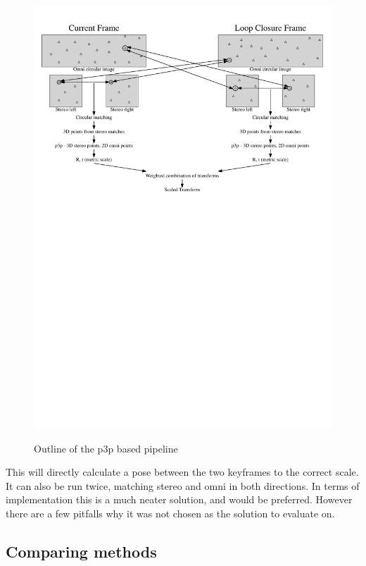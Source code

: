 \begin{figure}[H]
  \centering
    \includegraphics[width=1.0\textwidth]{chapters/images/6_images_p3p}\\
  \caption{Outline of the p3p based pipeline}
  \label{fig:p3p_flowchart}
\end{figure}

This will directly calculate a pose between the two keyframes to the correct scale.  It can also be run twice, matching stereo and omni in both directions. In terms of implementation this is a much neater solution, and would be preferred.  However there are a few pitfalls why it was not chosen as the solution to evaluate on.

\subsection{Comparing methods}

